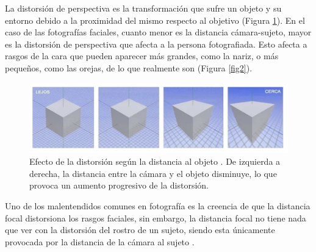 La distorsión de perspectiva \cite{8,51} es la transformación que sufre un objeto y su entorno debido a la proximidad del mismo respecto al objetivo (Figura \ref{fig15}). En el caso de las fotografías faciales, cuanto menor es la distancia cámara-sujeto, mayor es la distorsión de perspectiva que afecta a la persona fotografiada. Esto afecta a rasgos de la cara que pueden aparecer más grandes, como la nariz, o más pequeños, como las orejas, de lo que realmente son (Figura \ref{fig2}).

\begin{figure}[h]
	\centering
	\includegraphics[scale=0.5]{imagenes/cap2/distorsion.png}
	\caption[Efectos de la distorsión según distancia.]{Efecto de la distorsión según la distancia al objeto \cite{51}. De izquierda a derecha, la distancia entre la cámara y el objeto disminuye, lo que provoca un aumento progresivo de la distorsión.}
	\label{fig15}
\end{figure}

Uno de los malentendidos comunes en fotografía es la creencia de que la distancia focal distorsiona los rasgos faciales, sin embargo, la distancia focal no tiene nada que ver con la distorsión del rostro de un sujeto, siendo esta únicamente provocada por la distancia de la cámara al sujeto \cite{52}.



